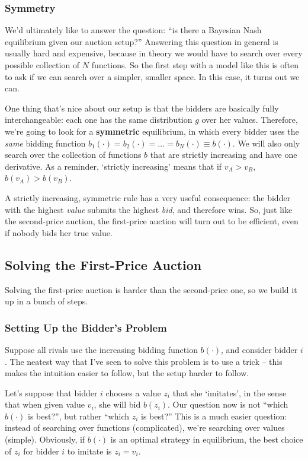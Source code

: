 \documentclass[12pt]{article}
\theoremstyle{definition}
\theoremstyle{remark}
\theoremstyle{plain}                          %
\begin{document}
\subsubsection{Symmetry}

We'd ultimately like to answer the question: ``is there a Bayesian Nash equilibrium given our auction setup?'' Answering this question in general is usually hard and expensive, because in theory we would have to search over every possible collection of $N$ functions. So the first step with a model like this is often to ask if we can search over a simpler, smaller space. In this case, it turns out we can.

One thing that's nice about our setup is that the bidders are basically fully interchangeable: each one has the same distribution $g$ over her values. Therefore, we're going to look for a \textbf{symmetric} equilibrium,
in which every bidder uses the \emph{same} bidding function $b_1(\cdot)=b_2(\cdot)=\dots=b_N(\cdot)\equiv b(\cdot)$. We will also only search over the collection of functions $b$ that are strictly increasing and have one derivative. As a reminder, `strictly increasing' means that if $v_A > v_B$, $b(v_A)>b(v_B)$.

A strictly increasing, symmetric rule has a very useful consequence: the bidder with the highest \emph{value} submits the highest \emph{bid}, and therefore wins.
So, just like the second-price auction, the first-price auction will turn out to be efficient, even if nobody bids her true value.

\subsection{Solving the First-Price Auction}\label{sec:solve}

Solving the first-price auction is harder than the second-price one, so we build it up in a bunch of steps.

\subsubsection{Setting Up the Bidder's Problem}

Suppose all rivals use the increasing bidding function $b(\cdot)$, and consider bidder $i$. The neatest way that I've seen to solve this problem is to use a trick -- this makes the intuition easier to follow, but the setup harder to follow.

Let's suppose that bidder $i$ chooses a value $z_i$ that she `imitates', in the sense that when given value $v_i$, she will bid $b(z_i)$. Our question now is not ``which $b(\cdot)$ is best?'', but rather ``which $z_i$ is best?'' This is a much easier question: instead of searching over functions (complicated), we're searching over values (simple). Obviously, if $b(\cdot)$ is an optimal strategy in equilibrium, the best choice of $z_i$ for bidder $i$ to imitate is $z_i = v_i$.\\
\end{document}
